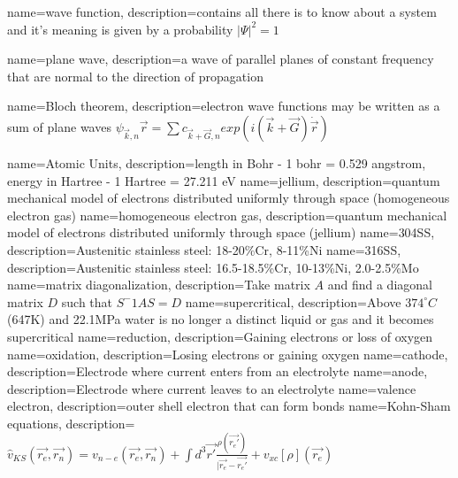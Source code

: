 {
    name={wave function},
    description={contains all there is to know about a system and it's meaning is given by a probability ${\lvert \Psi \rvert}^2 = 1 $}
}

{
    name={plane wave},
    description={a wave of parallel planes of constant frequency that are normal to the direction of propagation}
}

{
    name={Bloch theorem},
    description={electron wave functions may be written as a sum of plane waves $\psi_{\vec{k},n} \vec{r} = \sum c_{\vec{k} + \vec{G}, n} exp(i (\vec{k} + \vec{G}) \dot \vec{r})$}
}

{
    name={Atomic Units},
    description={length in Bohr - 1 bohr = 0.529 angstrom, energy in Hartree - 1 Hartree = 27.211 eV}
}
{
    name={jellium},
    description={quantum mechanical model of electrons distributed uniformly through space (homogeneous electron gas)}
}
{
    name={homogeneous electron gas},
    description={quantum mechanical model of electrons distributed uniformly through space (jellium)}
}
{
    name={304SS},
    description={Austenitic stainless steel: 18-20\%Cr, 8-11\%Ni}
}
{
    name={316SS},
    description={Austenitic stainless steel: 16.5-18.5\%Cr, 10-13\%Ni, 2.0-2.5\%Mo}
}
{
    name={matrix diagonalization},
    description={Take matrix $A$ and find a diagonal matrix $D$ such that $S^-1 A S = D$}
}
{
    name=supercritical,
    description={Above $374^{\circ}C$ (647K) and 22.1MPa water is no longer a distinct liquid or gas and it becomes supercritical}
}
{
    name=reduction,
    description={Gaining electrons or loss of oxygen}
}
{
    name=oxidation,
    description={Losing electrons or gaining oxygen}
}
{
    name=cathode,
    description={Electrode where current enters from an electrolyte}
}
{
    name=anode,
    description={Electrode where current leaves to an electrolyte}
}
{
    name=valence electron,
    description={outer shell electron that can form bonds}
}
{
    name=Kohn-Sham equations,
    description={$\hat{v}_{KS}(\vec{r_e}, \vec{r_n}) = v_{n-e}(\vec{r_e}, \vec{r_n}) + \int d^3\vec{r'} \frac{\rho(\vec{r_{e}'})}{\lvert \vec{r_{e}} - \vec{r_{e}'}} + v_{xc}[\rho](\vec{r_{e}})$}
}
